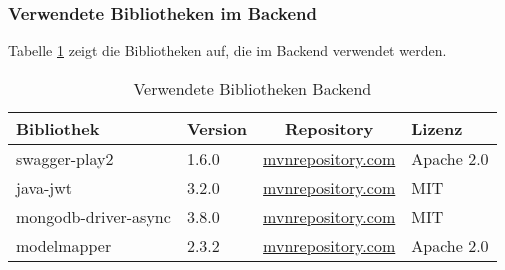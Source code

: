 \subsubsection{Verwendete Bibliotheken im Backend}
Tabelle \ref{tab:verwendete-libraries-play} zeigt die Bibliotheken auf, die im Backend verwendet werden. 
\begin{table}[h]
	\centering
	\begin{tabular}{| l | l | c | l |}
		\hline
		\textbf{Bibliothek} & \textbf{Version} & \textbf{Repository} & \textbf{Lizenz}\\
		\hline
		swagger-play2 & 1.6.0 & \href{https://mvnrepository.com/artifact/io.swagger/swagger-play2_2.12/1.6.0}{mvnrepository.com} & Apache 2.0 \\
		java-jwt & 3.2.0 & \href{https://mvnrepository.com/artifact/com.auth0/java-jwt/3.2.0}{mvnrepository.com} & MIT \\
		mongodb-driver-async & 3.8.0 & \href{https://mvnrepository.com/artifact/org.mongodb/mongodb-driver-async/3.8.0}{mvnrepository.com} & MIT \\
		modelmapper & 2.3.2 & \href{https://mvnrepository.com/artifact/org.modelmapper/modelmapper/2.3.2}{mvnrepository.com} & Apache 2.0 \\
		\hline
	\end{tabular}
	\caption[Story-Points]{Verwendete Bibliotheken Backend}
	\label{tab:verwendete-libraries-play}
\end{table}

